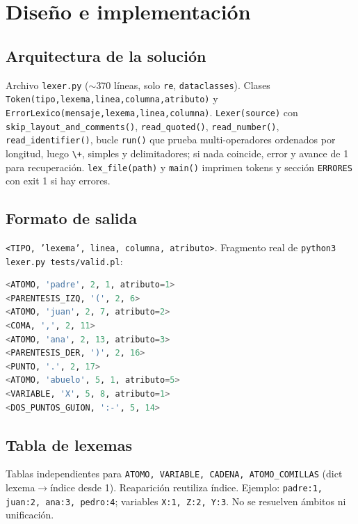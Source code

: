\documentclass[12pt,a4paper]{article}
\begin{document}
\section{Diseño e implementación}
\subsection{Arquitectura de la solución}
Archivo \texttt{lexer.py} ($\sim$370 líneas, solo \texttt{re}, \texttt{dataclasses}). Clases \texttt{Token(tipo,lexema,linea,columna,atributo)} y \texttt{ErrorLexico(mensaje,lexema,linea,columna)}. \texttt{Lexer(source)} con \texttt{skip\_layout\_and\_comments()}, \texttt{read\_quoted()}, \texttt{read\_number()}, \texttt{read\_identifier()}, bucle \texttt{run()} que prueba multi-operadores ordenados por longitud, luego \texttt{\textbackslash+}, simples y delimitadores; si nada coincide, error y avance de 1 para recuperación. \texttt{lex\_file(path)} y \texttt{main()} imprimen tokens y sección \texttt{ERRORES} con exit 1 si hay errores.

\subsection{Formato de salida}
\texttt{\textless TIPO, 'lexema', linea, columna, atributo\textgreater}. Fragmento real de \texttt{python3 lexer.py tests/valid.pl}:
\begin{lstlisting}[language=Python]
<ATOMO, 'padre', 2, 1, atributo=1>
<PARENTESIS_IZQ, '(', 2, 6>
<ATOMO, 'juan', 2, 7, atributo=2>
<COMA, ',', 2, 11>
<ATOMO, 'ana', 2, 13, atributo=3>
<PARENTESIS_DER, ')', 2, 16>
<PUNTO, '.', 2, 17>
<ATOMO, 'abuelo', 5, 1, atributo=5>
<VARIABLE, 'X', 5, 8, atributo=1>
<DOS_PUNTOS_GUION, ':-', 5, 14>
\end{lstlisting}

\subsection{Tabla de lexemas}
Tablas independientes para \texttt{ATOMO, VARIABLE, CADENA, ATOMO\_COMILLAS} (dict lexema$\rightarrow$índice desde 1). Reaparición reutiliza índice. Ejemplo: \texttt{padre:1, juan:2, ana:3, pedro:4}; variables \texttt{X:1, Z:2, Y:3}. No se resuelven ámbitos ni unificación.
\end{document}
